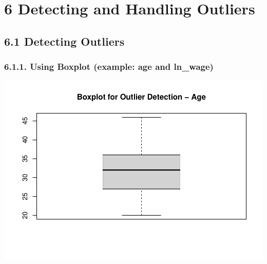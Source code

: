 \documentclass[
]{article}
\newenvironment{Shaded}{\begin{snugshade}}{\end{snugshade}}
\newcommand{\AttributeTok}[1]{\textcolor[rgb]{0.13,0.29,0.53}{#1}}
\newcommand{\FunctionTok}[1]{\textcolor[rgb]{0.13,0.29,0.53}{\textbf{#1}}}
\newcommand{\NormalTok}[1]{#1}
\newcommand{\SpecialCharTok}[1]{\textcolor[rgb]{0.81,0.36,0.00}{\textbf{#1}}}
\newcommand{\StringTok}[1]{\textcolor[rgb]{0.31,0.60,0.02}{#1}}
\begin{document}
\hypertarget{detecting-and-handling-outliers}{%
\section{6 Detecting and Handling
Outliers}\label{detecting-and-handling-outliers}}

\hypertarget{detecting-outliers}{%
\subsection{6.1 Detecting Outliers}\label{detecting-outliers}}

\hypertarget{using-boxplot-example-age-and-ln_wage}{%
\subsubsection{6.1.1. Using Boxplot (example: age and
ln\_wage)}\label{using-boxplot-example-age-and-ln_wage}}

\begin{Shaded}
\end{Shaded}

\includegraphics{RIntro_files/figure-latex/unnamed-chunk-13-1.pdf}

\begin{Shaded}
\end{Shaded}
\end{document}
